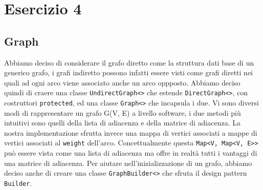 \documentclass[12pt, letterpaper]{report}
\begin{document}
\chapter*{Esercizio 4}
\section{Graph}
Abbiamo deciso di considerare il grafo diretto come la struttura dati base di un 
generico grafo, i grafi indiretto possono infatti essere visti come grafi diretti 
nei quali ad ogni arco viene associato anche un arco oppposto. Abbiamo deciso quindi 
di craere una classe \verb|UndirectGraph<>| che estende \verb|DirectGraph<>|, con 
costruttori \verb|protected|, ed una classe \verb|Graph<>| che incapsula i due.
\newline
\newline
Vi sono diversi modi di rappresentare un grafo G(V, E) a livello software, i due metodi 
più intuitivi sono quelli della lista di adiacenza e della matrice di adiacenza.
La nostra implementazione sfrutta invece una mappa di vertici associati a mappe di 
vertici associati al \verb|weight| dell'arco. 
\newline
Concettualmente questa \verb|Map<V, Map<V, E>>| può essere vista come una lista di 
adiacenza ma offre in realtà tutti i vantaggi di una matrice di adiacenza.
\newline
\newline
Per aiutare nell'inizializzazione di un grafo, abbiamo deciso anche di creare una 
classe \verb|GraphBuilder<>| che sfruta il design pattern \verb|Builder|.
\end{document}
